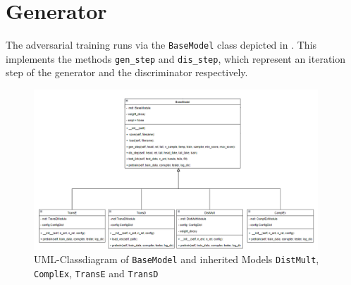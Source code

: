\section{Generator}
\label{sec:generator}





The adversarial training runs via the \texttt{BaseModel} class depicted in .
This implements the methods \texttt{gen\_step} and \texttt{dis\_step}, which represent an iteration step of the generator and the discriminator respectively.
\begin{figure}[t]
  \centering
    \includegraphics[width=0.95\textwidth]{figures/BaseModel.png}
  \caption{\ac{UML}-Classdiagram of \texttt{BaseModel} and inherited Models  \texttt{DistMult},  \texttt{ComplEx},  \texttt{TransE} and  \texttt{TransD}}
  \label{fig:basemodel_classdiagram}
\end{figure}